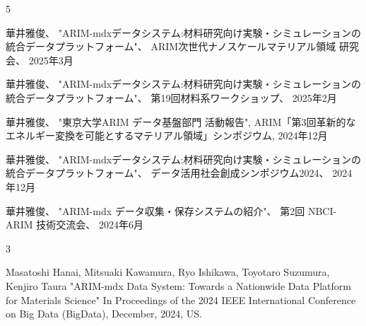 \begin{招待講演}{5}

華井雅俊、 
"ARIM-mdxデータシステム:材料研究向け実験・シミュレーションの統合データプラットフォーム"、
ARIM次世代ナノスケールマテリアル領域 研究会、
2025年3月

華井雅俊、 
"ARIM-mdxデータシステム:材料研究向け実験・シミュレーションの統合データプラットフォーム"、
第19回材料系ワークショップ、
2025年2月

華井雅俊、
"東京大学ARIM データ基盤部門 活動報告",
ARIM「第3回革新的なエネルギー変換を可能とするマテリアル領域」シンポジウム,
2024年12月


華井雅俊、
"ARIM-mdxデータシステム:材料研究向け実験・シミュレーションの統合データプラットフォーム"、
データ活用社会創成シンポジウム2024、
2024年12月

華井雅俊、 
"ARIM-mdx データ収集・保存システムの紹介"、
第2回 NBCI-ARIM 技術交流会、
2024年6月

\end{招待講演}

\begin{査読付}{3}

Masatoshi Hanai, Mitsuaki Kawamura, Ryo Ishikawa, Toyotaro Suzumura, Kenjiro Taura
"ARIM-mdx Data System: Towards a Nationwide Data Platform for Materials Science"
In Proceedings of the 2024 IEEE International Conference on Big Data (BigData), December, 2024, US.




\end{査読付}

